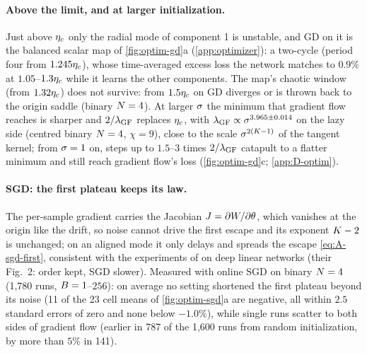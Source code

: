 \paragraph{Above the limit, and at larger initialization.}
\derived{} \empirical{}  Just above $\eta_c$ only the radial mode of component 1 is unstable, and GD on it is the
balanced scalar map of \cref{fig:optim-gd}a (\cref{app:optimizer}): a two-cycle (period four from $1.245\eta_c$),
whose time-averaged excess loss the network matches to $0.9\%$ at $1.05$--$1.3\eta_c$ while it learns the other
components. The map's chaotic window (from $1.32\eta_c$) does not survive: from $1.5\eta_c$ on GD diverges or is
thrown back to the origin saddle (binary $N=4$). At larger $\sigma$ the minimum that gradient flow reaches is
sharper and $2/\lambda_{\rm GF}$ replaces $\eta_c$, with $\lambda_{\rm GF}\propto\sigma^{3.965\pm0.014}$ on the lazy side
(centred binary $N=4$, $\chi=9$), close to the scale $\sigma^{2(K-1)}$ of the tangent kernel; from $\sigma=1$ on, steps up
to $1.5$--$3$ times $2/\lambda_{\rm GF}$ catapult to a flatter minimum and still reach gradient flow's loss
(\cref{fig:optim-gd}c; \cref{app:D-optim}).

\paragraph{SGD: the first plateau keeps its law.}
\derived{}  The per-sample gradient
carries the Jacobian $J=\partial W/\partial\theta$, which vanishes at the origin like the drift, so noise cannot drive
the first escape and its exponent $K-2$ is unchanged; on an aligned mode it only delays and spreads the escape
\eqref{eq:A-sgd-first}, consistent with the experiments of \citet{corlouer2026stochastic} on deep linear networks
(their Fig.~2: order kept, SGD slower). Measured \empirical{} with online SGD on binary $N=4$ (1,780 runs,
$B=1$--$256$): on average no setting shortened the first plateau beyond its noise (11 of the 23 cell means of
\cref{fig:optim-sgd}a are negative, all within $2.5$ standard errors of zero and none below $-1.0\%$), while single
runs scatter to both sides of gradient flow (earlier in 787 of the 1,600 runs from random initialization, by more
than $5\%$ in 141).

